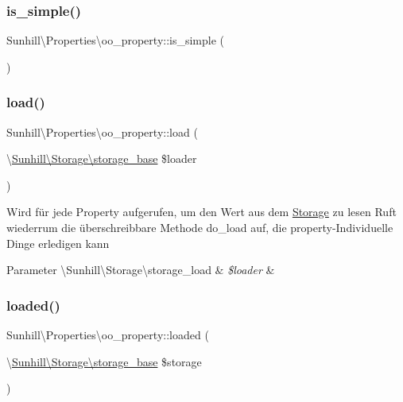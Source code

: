 \subsubsection{\texorpdfstring{is\+\_\+simple()}{is\_simple()}}
{\footnotesize\ttfamily Sunhill\textbackslash{}\+Properties\textbackslash{}oo\+\_\+property\+::is\+\_\+simple (\begin{DoxyParamCaption}{ }\end{DoxyParamCaption})}

\mbox{\label{classSunhill_1_1Properties_1_1oo__property_a58fdf3b85b14a1ff2c5347c9d9b5fa71}} 
\subsubsection{\texorpdfstring{load()}{load()}}
{\footnotesize\ttfamily Sunhill\textbackslash{}\+Properties\textbackslash{}oo\+\_\+property\+::load (\begin{DoxyParamCaption}\item[{\textbackslash{}\hyperlink{classSunhill_1_1Storage_1_1storage__base}{Sunhill\textbackslash{}\+Storage\textbackslash{}storage\+\_\+base}}]{\$loader }\end{DoxyParamCaption})\hspace{0.3cm}{\ttfamily [final]}}

Wird für jede Property aufgerufen, um den Wert aus dem \hyperlink{namespaceSunhill_1_1Storage}{Storage} zu lesen Ruft wiederrum die überschreibbare Methode do\+\_\+load auf, die property-\/\+Individuelle Dinge erledigen kann 
\begin{DoxyParams}[1]{Parameter}
\textbackslash{}\+Sunhill\textbackslash{}\+Storage\textbackslash{}storage\+\_\+load & {\em \$loader} & \\
\hline
\end{DoxyParams}
\mbox{\label{classSunhill_1_1Properties_1_1oo__property_a97c652f03a3fc8a770e7ac0f135f112e}} 
\subsubsection{\texorpdfstring{loaded()}{loaded()}}
{\footnotesize\ttfamily Sunhill\textbackslash{}\+Properties\textbackslash{}oo\+\_\+property\+::loaded (\begin{DoxyParamCaption}\item[{\textbackslash{}\hyperlink{classSunhill_1_1Storage_1_1storage__base}{Sunhill\textbackslash{}\+Storage\textbackslash{}storage\+\_\+base}}]{\$storage }\end{DoxyParamCaption})}

